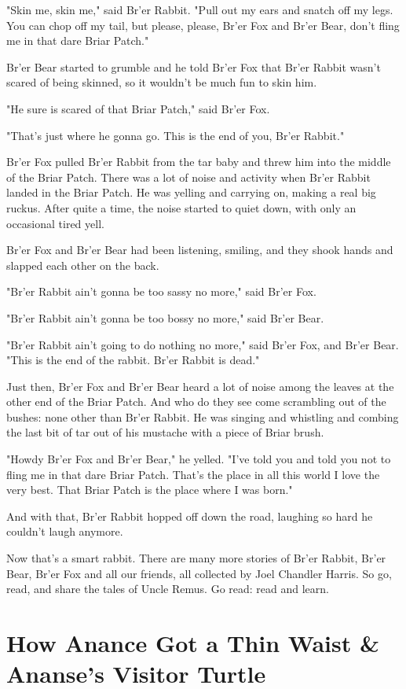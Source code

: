 "Skin me, skin me," said Br'er Rabbit. "Pull out my ears and snatch off my legs. You can chop off my tail, but please, please, Br'er Fox and Br'er Bear, don't fling me in that dare Briar Patch."

Br'er Bear started to grumble and he told Br'er Fox that Br'er Rabbit wasn't scared of being skinned, so it wouldn't be much fun to skin him.

"He sure is scared of that Briar Patch," said Br'er Fox.

"That's just where he gonna go. This is the end of you, Br'er Rabbit."

Br'er Fox pulled Br'er Rabbit from the tar baby and threw him into the middle of the Briar Patch. There was a lot of noise and activity when Br'er Rabbit landed in the Briar Patch. He was yelling and carrying on, making a real big ruckus. After quite a time, the noise started to quiet down, with only an occasional tired yell.

Br'er Fox and Br'er Bear had been listening, smiling, and they shook hands and slapped each other on the back.

"Br'er Rabbit ain't gonna be too sassy no more," said Br'er Fox.

"Br'er Rabbit ain't gonna be too bossy no more," said Br'er Bear.

"Br'er Rabbit ain't going to do nothing no more," said Br'er Fox, and Br'er Bear. "This is the end of the rabbit. Br'er Rabbit is dead."

Just then, Br'er Fox and Br'er Bear heard a lot of noise among the leaves at the other end of the Briar Patch. And who do they see come scrambling out of the bushes: none other than Br'er Rabbit. He was singing and whistling and combing the last bit of tar out of his mustache with a piece of Briar brush.

"Howdy Br'er Fox and Br'er Bear," he yelled. "I've told you and told you not to fling me in that dare Briar Patch. That's the place in all this world I love the very best. That Briar Patch is the place where I was born."

And with that, Br'er Rabbit hopped off down the road, laughing so hard he couldn't laugh anymore.

Now that's a smart rabbit. There are many more stories of Br'er Rabbit, Br'er Bear, Br'er Fox and all our friends, all collected by Joel Chandler Harris. So go, read, and share the tales of Uncle Remus. Go read: read and learn.

\section{How Anance Got a Thin Waist \& Ananse's Visitor Turtle}

